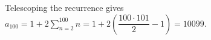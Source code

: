 Telescoping the recurrence gives $a_{100}=1+2\sum_{n=2}^{100}n=1+2(\dfrac{100\cdot101}{2}-1)=\boxed{10099}$.
